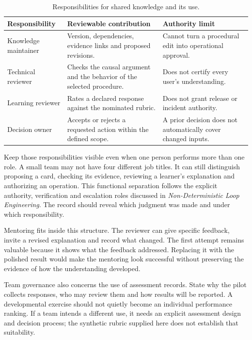 \begin{table}[H]\centering\small
\caption{Responsibilities for shared knowledge and its use.}\label{tab:ch13-governance}
\begin{tabularx}{\textwidth}{@{}p{}X X@{}}\toprule
\textbf{Responsibility} & \textbf{Reviewable contribution} & \textbf{Authority limit}\\\midrule
Knowledge maintainer & Version, dependencies, evidence links and proposed revisions. & Cannot turn a procedural edit into operational approval.\\
Technical reviewer & Checks the causal argument and the behavior of the selected procedure. & Does not certify every user's understanding.\\
Learning reviewer & Rates a declared response against the nominated rubric. & Does not grant release or incident authority.\\
Decision owner & Accepts or rejects a requested action within the defined scope. & A prior decision does not automatically cover changed inputs.\\\bottomrule
\end{tabularx}
\end{table}

Keep those responsibilities visible even when one person performs more than one role. A small team may not have four different job titles. It can still distinguish proposing a card, checking its evidence, reviewing a learner's explanation and authorizing an operation. This functional separation follows the explicit authority, verification and escalation roles discussed in \emph{Non-Deterministic Loop Engineering}.\autocite{papaliniNDLE} The record should reveal which judgment was made and under which responsibility.

Mentoring fits inside this structure. The reviewer can give specific feedback, invite a revised explanation and record what changed. The first attempt remains valuable because it shows what the feedback addressed. Replacing it with the polished result would make the mentoring look successful without preserving the evidence of how the understanding developed.

Team governance also concerns the use of assessment records. State why the pilot collects responses, who may review them and how results will be reported. A developmental exercise should not quietly become an individual performance ranking. If a team intends a different use, it needs an explicit assessment design and decision process; the synthetic rubric supplied here does not establish that suitability.

